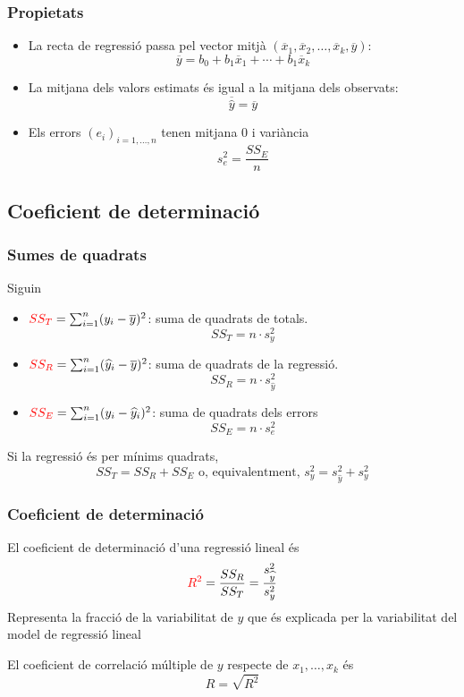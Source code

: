 \documentclass[12pt,t]{beamer}
\newcommand{\red}[1]{\textcolor{red}{#1}}
\renewcommand{\emph}[1]{{\color{red}#1}}
\theoremstyle{plain}
\theoremstyle{definition}
\begin{document}
\begin{frame}
\frametitle{Propietats}

\begin{itemize}
\item La recta de regressió passa pel vector mitjà
$(\overline{x}_1,\overline{x}_2,\ldots,\overline{x}_k,\overline{y})$:
$$
\overline{y}=b_0+b_1 \overline{x}_1+\cdots+b_1 \overline{x}_k
$$

\item La mitjana dels valors estimats és igual a la mitjana dels
observats:
$$
\overline{\widehat{y}}=\overline{y}
$$

\item Els errors $(e_i)_{i=1,\ldots,n}$ tenen mitjana 0 i variància
$$
s_e^2=\frac{SS_E}{n}
$$

\end{itemize}

\end{frame}








\subsection{Coeficient de determinació}
\begin{frame}
\frametitle{Sumes de quadrats}
Siguin
\begin{itemize}
\item $\red{SS_T}=\sum_{i=1}^n (y_i-\overline{y})^2$: suma de quadrats de totals.
$$
SS_T=n\cdot s_y^2
$$

\item $\red{SS_R}=\sum_{i=1}^n(\widehat{y}_i-\overline{y})^2$: suma de quadrats de la regressió.
$$
SS_R=n\cdot s_{\widehat{y}}^2
$$

\item $\red{SS_E}=\sum_{i=1}^n (y_i-\widehat{y}_i)^2$: suma de quadrats dels errors
$$
SS_E=n\cdot s_{e}^2
$$
\end{itemize}
\medskip

Si la regressió és per mínims quadrats,
$$
SS_T=SS_R+SS_E\mbox{ o, equivalentment, }
s^2_y=s^2_{\widehat{y}}+s^2_y
$$
\end{frame}


\begin{frame}
\frametitle{Coeficient de determinació}

El \emph{coeficient de determinació} d'una regressió lineal és
$$
\red{R^2}=\frac{SS_R}{SS_T}=\frac{s^2_{\widehat{y}}}{s^2_y}
$$
Representa la fracció de la variabilitat de $y$ que és explicada
per la variabilitat del model de regressió lineal
\medskip

El \emph{coeficient de correlació múltiple} de  $y$ respecte de $x_1,\ldots, x_k$ és
$$
R=\sqrt{R^2}
$$
\end{frame}
\end{document}
